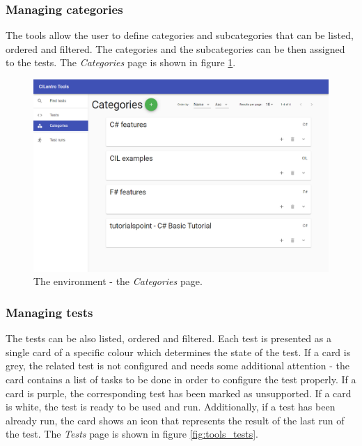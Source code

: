 \documentclass{article}
\numberwithin{equation}{section}
\begin{document}
\subsubsection{Managing categories}

The tools allow the user to define categories and subcategories that can be listed, ordered and filtered. The categories and the subcategories can be then assigned to the tests. The \textit{Categories} page is shown in figure \ref{fig:tools_categories}.

\begin{figure}
	\includegraphics[width=1\textwidth]{tools_categories.png}
    \centering
    \caption{The environment - the \textit{Categories} page.}
    \label{fig:tools_categories}
\end{figure}

\subsubsection{Managing tests}

The tests can be also listed, ordered and filtered. Each test is presented as a single card of a specific colour which determines the state of the test. If a card is grey, the related test is not configured and needs some additional attention - the card contains a list of tasks to be done in order to configure the test properly. If a card is purple, the corresponding test has been marked as unsupported. If a card is white, the test is ready to be used and run. Additionally, if a test has been already run, the card shows an icon that represents the result of the last run of the test. The \textit{Tests} page is shown in figure \ref{fig:tools_tests}.
\end{document}
